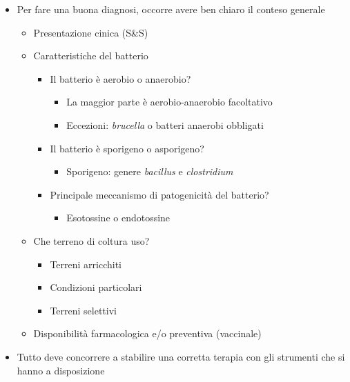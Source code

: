 \documentclass[italian,]{article}
\providecommand{\tightlist}{%
  \setlength{\itemsep}{0pt}\setlength{\parskip}{0pt}}
\begin{document}
\begin{itemize}
\tightlist
\item
  Per fare una buona diagnosi, occorre avere ben chiaro il conteso
  generale

  \begin{itemize}
  \tightlist
  \item
    Presentazione cinica (S\&S)
  \item
    Caratteristiche del batterio

    \begin{itemize}
    \tightlist
    \item
      Il batterio è aerobio o anaerobio?

      \begin{itemize}
      \tightlist
      \item
        La maggior parte è aerobio-anaerobio facoltativo
      \item
        Eccezioni: \emph{brucella} o batteri anaerobi obbligati
      \end{itemize}
    \item
      Il batterio è sporigeno o asporigeno?

      \begin{itemize}
      \tightlist
      \item
        Sporigeno: genere \emph{bacillus} e \emph{clostridium}
      \end{itemize}
    \item
      Principale meccanismo di patogenicità del batterio?

      \begin{itemize}
      \tightlist
      \item
        Esotossine o endotossine
      \end{itemize}
    \end{itemize}
  \item
    Che terreno di coltura uso?

    \begin{itemize}
    \tightlist
    \item
      Terreni arricchiti
    \item
      Condizioni particolari
    \item
      Terreni selettivi
    \end{itemize}
  \item
    Disponibilità farmacologica e/o preventiva (vaccinale)
  \end{itemize}
\item
  Tutto deve concorrere a stabilire una corretta terapia con gli
  strumenti che si hanno a disposizione
\end{itemize}
\end{document}
